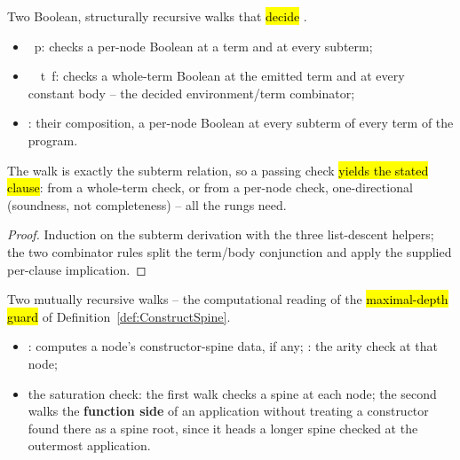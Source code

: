 \begin{definition}
\label{def:onProgramB}
\leanok
{}
 Two Boolean, structurally recursive walks that \hl{decide} .
\begin{itemize}
\item {}\ p: checks a per-node Boolean at a term and at every subterm;
\item {}\ \Gamma\ t\ f: checks a whole-term Boolean at the emitted term and at every constant
body -- the decided environment/term combinator;
\item {}: their composition, a per-node Boolean at every subterm of every term of the
program.
\end{itemize}
\end{definition}

\begin{lemma}
\label{lem:onProgramB_sound}
\leanok
{}
 The walk is exactly the subterm relation, so a passing check \hl{yields the stated
clause}: from a whole-term check, or from a per-node check, one-directional (soundness, not
completeness) -- all the rungs need.

\end{lemma}
\begin{proof}
\leanok
{}
 Induction on the subterm derivation with the three list-descent helpers; the two combinator
rules split the term/body conjunction and apply the supplied per-clause implication.
\end{proof}

\begin{definition}
\label{def:ctorSatB}
\leanok
{}
 Two mutually recursive walks -- the computational reading of the \hl{maximal-depth
guard} of Definition~\ref{def:ConstructSpine}.
\begin{itemize}
\item {}: computes a node's constructor-spine data, if any; : the arity
check at that node;
\item the saturation check: the first walk checks a spine at each node; the second walks the
\textbf{function side} of an application without treating a constructor found there as a spine root,
since it heads a longer spine checked at the outermost application.
\end{itemize}
\end{definition}

